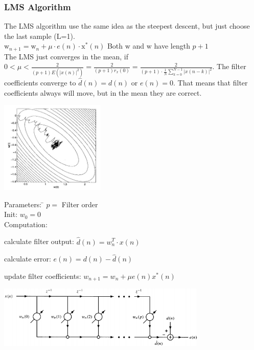 \subsubsection{LMS Algorithm }
\begin{minipage}{14cm}

  The LMS algorithm use the same idea as the steepest descent, but just choose the last sample (L=1).\\
  $\boxed{ \mathrm{w}_{n+1}=\mathrm{w}_n+\mu \cdot e(n) \cdot \mathrm{x^*}(n) }$ Both $\mathrm{w}$ and $\mathrm{w}$ have length $p+1$\\

  The LMS just converges in the mean, if $\displaystyle 0<\mu< \frac{2}{(p+1)E\left(|x(n)|^2\right)}=\frac{2}{(p+1)r_x(0)}=\frac{2}{(p+1) \cdot \frac{1}{N} \sum\limits_{k=0}^{N-1}|x(n-k)|^2}$.
  The filter coefficients converge to $\hat d(n) = d(n)$ or $e(n) = 0$.
  That means that filter coefficients always will move, but in the mean they are correct.
\end{minipage}
\begin{minipage}{5cm}
  \includegraphics[width=5cm]{../TSM_StatDig/bilder/LMS.jpg}
\end{minipage}

\begin{minipage}{9cm}
  \begin{tabbing}
  	Parameters:  \= $p= $ Filter order\\
  	Init:		\> $w_0= 0$\\
  	Computation:
  \end{tabbing}
      \begin{aufzaehlung}
          \item calculate filter output: $\hat{d}(n) = w_n^T\cdot x(n)$
          \item calculate error: $e(n) = d(n) - \hat{d}(n)$
          \item update filter coefficients: $w_{n+1}=w_n+\mu e(n)x^*(n)$
      \end{aufzaehlung}\vspace{0.05cm}

\end{minipage}
\begin{minipage}{10cm}
  \includegraphics[width=10cm]{../TSM_StatDig/bilder/adaptiveFirStructure.png}
\end{minipage}

